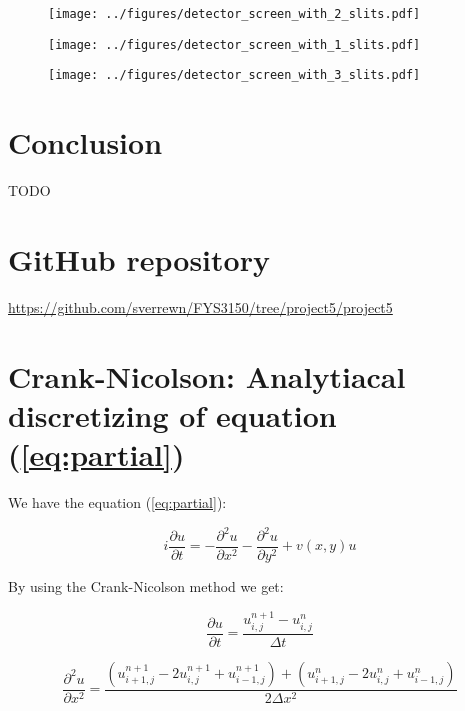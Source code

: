 \documentclass[english,notitlepage,reprint,nofootinbib]{revtex4-1}  %
\begin{document}
\begin{figure}[H]
	\centering
	\texttt{[image: ../figures/detector\_screen\_with\_2\_slits.pdf]} %
	\caption{}
	\label{fig:prob_2_slits}
\end{figure}

\begin{figure}[H]
	\centering
	\texttt{[image: ../figures/detector\_screen\_with\_1\_slits.pdf]} %
	\caption{}
	\label{fig:prob_1_slits}
\end{figure}

\begin{figure}[H]
	\centering
	\texttt{[image: ../figures/detector\_screen\_with\_3\_slits.pdf]} %
	\caption{}
	\label{fig:prob_3_slits}
\end{figure}
\section{Conclusion}\label{sec:conclusion}
%
TODO

\newpage
\onecolumngrid
\appendix
\section{GitHub repository} \label{sec:ap1}
\url{https://github.com/sverrewn/FYS3150/tree/project5/project5} 

\section{Crank-Nicolson: Analytiacal discretizing of equation (\ref{eq:partial})} \label{sec:ap2}

We have the equation (\ref{eq:partial}):   

\begin{equation}
    i \frac{\partial u}{\partial t} = - \frac{\partial^2 u}{\partial x^2} - \frac{\partial^2 u}{\partial y^2} + v(x,y)u
\end{equation}

By using the Crank-Nicolson method we get:

\begin{equation} \label{eq:dudt}
    \frac{\partial u}{\partial t} = \frac{u_{i,j}^{n+1} - u_{i,j}^n}{\Delta t}
\end{equation} 

\begin{equation} \label{eq:x2}
    \frac{\partial^2 u}{\partial x^2} = \frac{ \left( u_{i+1, j}^{n+1} - 2u_{i, j}^{n+1} + u_{i-1, j}^{n+1} \right) + \left( u_{i+1, j}^{n} - 2u_{i, j}^{n} + u_{i-1, j}^{n} \right) }{2 \Delta x^2}
\end{equation}
\end{document}
